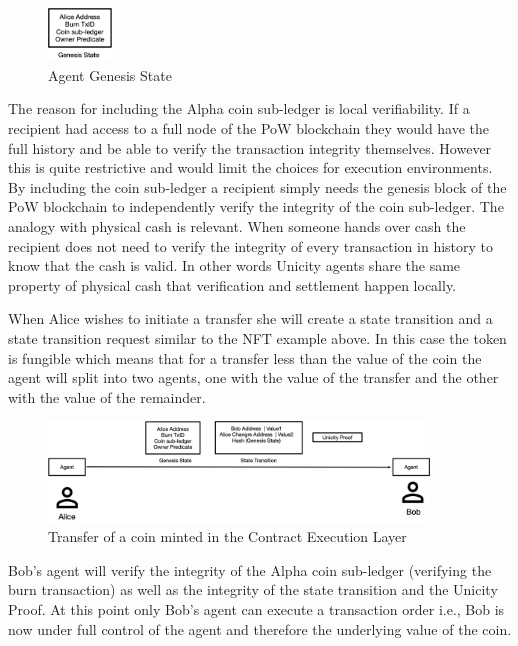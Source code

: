 \documentclass{article}
\begin{document}
\begin{figure}[htbp]
    \centering
    \includegraphics[width=0.15\textwidth]{CoinGenesis.png}
    \caption{Agent Genesis State}
    \label{fig:GenesisEvent}
\end{figure}

The reason for including the Alpha coin sub-ledger is local verifiability. If a recipient had access to a full node of the PoW blockchain they would have the full history and be able to verify the transaction integrity themselves. However this is quite restrictive and would limit the choices for execution environments. By including the coin sub-ledger a recipient simply needs the genesis block of the PoW blockchain to independently verify the integrity of the coin sub-ledger. The analogy with physical cash is relevant. When someone hands over cash the recipient does not need to verify the integrity of every transaction in history to know that the cash is valid. In other words Unicity agents share the same property of physical cash that verification and settlement happen locally. 
\vspace{2mm}

When Alice wishes to initiate a transfer she will create a state transition and a state transition request similar to the NFT example above. In this case the token is fungible which means that for a transfer less than the value of the coin the agent will split into two agents, one with the value of the transfer and the other with the value of the remainder.

\begin{figure}[H]
    \centering
    \includegraphics[width=0.9\textwidth]{Alice-Transfer.png}
    \caption{Transfer of a coin minted in the Contract Execution Layer}
    \label{fig:Alice Transfer}
\end{figure}


\vspace{2mm}

Bob's agent will verify the integrity of the Alpha coin sub-ledger (verifying the burn transaction) as well as the integrity of the state transition and the Unicity Proof. At this point only Bob's agent can execute a transaction order i.e., Bob is now under full control of the agent and therefore the underlying value of the coin.
\end{document}
